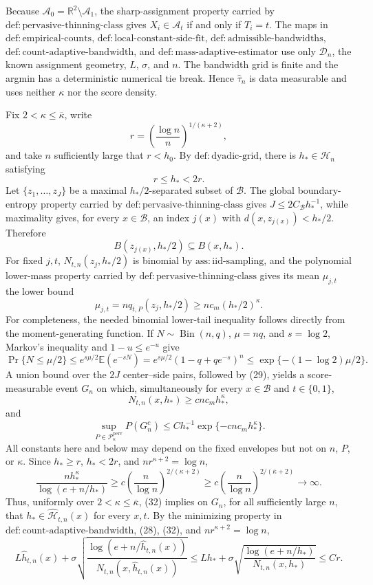 Because \(\mathcal A_0=\mathbb R^2\setminus\mathcal A_1\), the sharp-assignment property carried by \(\mathrm{def:pervasive\text{-}thinning\text{-}class}\) gives \(X_i\in\mathcal A_t\) if and only if \(T_i=t\).  The maps in \(\mathrm{def:empirical\text{-}counts}\), \(\mathrm{def:local\text{-}constant\text{-}side\text{-}fit}\), \(\mathrm{def:admissible\text{-}bandwidths}\), \(\mathrm{def:count\text{-}adaptive\text{-}bandwidth}\), and \(\mathrm{def:mass\text{-}adaptive\text{-}estimator}\) use only \(\mathcal D_n\), the known assignment geometry, \(L\), \(\sigma\), and \(n\).  The bandwidth grid is finite and the argmin has a deterministic numerical tie break.  Hence \(\widehat\tau_n\) is data measurable and uses neither \(\kappa\) nor the score density.

Fix \(2<\kappa\le\overline\kappa\), write
\[
 r=\left(\frac{\log n}{n}\right)^{1/(\kappa+2)},
\]
and take \(n\) sufficiently large that \(r<h_0\).  By \(\mathrm{def:dyadic\text{-}grid}\), there is \(h_*\in\mathcal H_n\) satisfying
\[
 r\le h_*<2r. \tag{28}
\]
Let \(\{z_1,\ldots,z_J\}\) be a maximal \(h_*/2\)-separated subset of \(\mathcal B\).  The global boundary-entropy property carried by \(\mathrm{def:pervasive\text{-}thinning\text{-}class}\) gives \(J\le2C_{\mathcal B}h_*^{-1}\), while maximality gives, for every \(x\in\mathcal B\), an index \(j(x)\) with \(d(x,z_{j(x)})<h_*/2\).  Therefore
\[
 B(z_{j(x)},h_*/2)\subseteq B(x,h_*). \tag{29}
\]
For fixed \(j,t\), \(N_{t,n}(z_j,h_*/2)\) is binomial by \(\mathrm{ass:iid\text{-}sampling}\), and the polynomial lower-mass property carried by \(\mathrm{def:pervasive\text{-}thinning\text{-}class}\) gives its mean \(\mu_{j,t}\) the lower bound
\[
 \mu_{j,t}=nq_{t,P}(z_j,h_*/2)
 \ge nc_m(h_*/2)^{\kappa}. \tag{30}
\]
For completeness, the needed binomial lower-tail inequality follows directly from the moment-generating function.  If \(N\sim\operatorname{Bin}(n,q)\), \(\mu=nq\), and \(s=\log2\), Markov's inequality and \(1-u\le e^{-u}\) give
\[
 \Pr\{N\le\mu/2\}
 \le e^{s\mu/2}\mathbb E(e^{-sN})
 =e^{s\mu/2}(1-q+qe^{-s})^n
 \le\exp\{-(1-\log2)\mu/2\}. \tag{31}
\]
A union bound over the \(2J\) center--side pairs, followed by (29), yields a score-measurable event \(G_n\) on which, simultaneously for every \(x\in\mathcal B\) and \(t\in\{0,1\}\),
\[
 N_{t,n}(x,h_*)\ge c n c_mh_*^{\kappa}, \tag{32}
\]
and
\[
 \sup_{P\in\mathcal P_{\kappa}^{\mathrm{perv}}}P(G_n^c)
 \le Ch_*^{-1}\exp\{-c n c_mh_*^{\kappa}\}. \tag{33}
\]
All constants here and below may depend on the fixed envelopes but not on \(n\), \(P\), or \(\kappa\).  Since \(h_*\ge r\), \(h_*<2r\), and \(nr^{\kappa+2}=\log n\),
\[
 \frac{nh_*^{\kappa}}{\log(e+n/h_*)}
 \ge c\left(\frac n{\log n}\right)^{2/(\kappa+2)}
 \ge c\left(\frac n{\log n}\right)^{2/(\overline\kappa+2)}
 \longrightarrow\infty. \tag{34}
\]
Thus, uniformly over \(2<\kappa\le\overline\kappa\), (32) implies on \(G_n\), for all sufficiently large \(n\), that \(h_*\in\widehat{\mathcal H}_{t,n}(x)\) for every \(x,t\).  By the minimizing property in \(\mathrm{def:count\text{-}adaptive\text{-}bandwidth}\), (28), (32), and \(nr^{\kappa+2}=\log n\),
\[
 L\widehat h_{t,n}(x)
 +\sigma\sqrt{\frac{\log(e+n/\widehat h_{t,n}(x))}
 {N_{t,n}(x,\widehat h_{t,n}(x))}}
 \le Lh_*+\sigma\sqrt{\frac{\log(e+n/h_*)}{N_{t,n}(x,h_*)}}
 \le Cr. \tag{35}
\]

